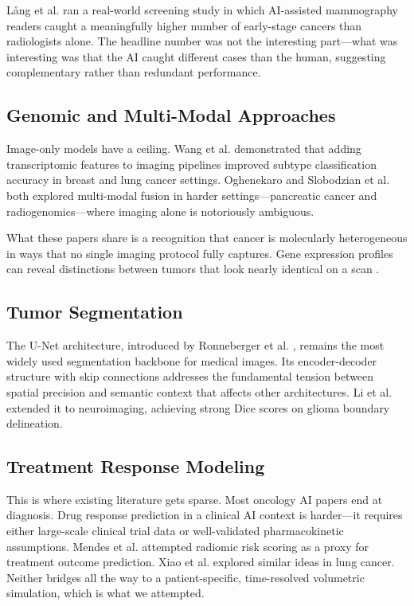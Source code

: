 \documentclass[conference]{IEEEtran}
\begin{document}
L{\aa}ng et al. \cite{lang2026} ran a real-world screening study in which AI-assisted mammography readers caught a meaningfully higher number of early-stage cancers than radiologists alone. The headline number was not the interesting part—what was interesting was that the AI caught different cases than the human, suggesting complementary rather than redundant performance.

\subsection{Genomic and Multi-Modal Approaches}
Image-only models have a ceiling. Wang et al. \cite{wang2025} demonstrated that adding transcriptomic features to imaging pipelines improved subtype classification accuracy in breast and lung cancer settings. Oghenekaro \cite{oghenekaro2025} and Slobodzian et al. \cite{slobodzian2025} both explored multi-modal fusion in harder settings—pancreatic cancer and radiogenomics—where imaging alone is notoriously ambiguous.

What these papers share is a recognition that cancer is molecularly heterogeneous in ways that no single imaging protocol fully captures. Gene expression profiles can reveal distinctions between tumors that look nearly identical on a scan \cite{wang2025}.

\subsection{Tumor Segmentation}
The U-Net architecture, introduced by Ronneberger et al. \cite{ronneberger2015}, remains the most widely used segmentation backbone for medical images. Its encoder-decoder structure with skip connections addresses the fundamental tension between spatial precision and semantic context that affects other architectures. Li et al. \cite{li2018brain} extended it to neuroimaging, achieving strong Dice scores on glioma boundary delineation.

\subsection{Treatment Response Modeling}
This is where existing literature gets sparse. Most oncology AI papers end at diagnosis. Drug response prediction in a clinical AI context is harder—it requires either large-scale clinical trial data or well-validated pharmacokinetic assumptions. Mendes et al. \cite{mendes2025} attempted radiomic risk scoring as a proxy for treatment outcome prediction. Xiao et al. \cite{xiao2025} explored similar ideas in lung cancer. Neither bridges all the way to a patient-specific, time-resolved volumetric simulation, which is what we attempted.
\end{document}
